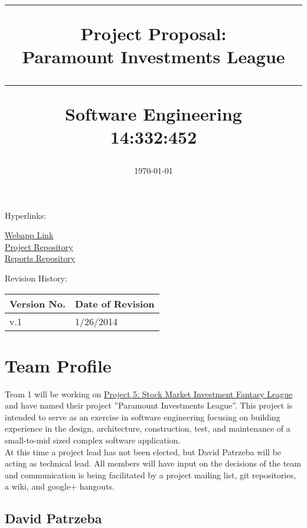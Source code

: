 \documentclass[11pt,letterpaper,oneside]{memoir}
\title{%
{\color{color2} \hrule}\vspace{1cm}
\Huge{\color{color1} Project Proposal:\\Paramount Investments League %
\vspace{1cm}
{\color{color2} \hrule}\vspace{1cm}}
\Large{ \color{color2} Software Engineering\\
14:332:452}
}
\author{\huge{\color{color0}Team 1:\\}\vskip.1in
\Large{\href{mailto:david.patrzeba@gmail.com}{David Patrzeba}\\
\href{mailto:eric.jacob.10@gmail.com}{Eric Jacob}\\
\href{mailto:evanarbeitman@gmail.edu}{Evan Arbeitman}\\
\href{mailto:christopher.a.mancuso@gmail.com}{Christopher Mancuso}\\
\href{mailto:dkarivalis@gmail.edu}{David Karivalis}\\
\href{mailto:jdlziegler@gmail.com}{Jesse Ziegler}}}
\date{\today}
\begin{document}
\titleGM    %

Hyperlinks:\\
\begin{center}
\href{http://192.241.248.91}{Webapp Link}\\
\href{https://github.com/dkarivalis/SEP_SMIFL}{Project Repository}\\
\href{https://github.com/dkarivalis/SEP_SMIFL_reports}{Reports Repository}\\
\end{center}

Revision History:
\begin{longtable}{|p{1.6in}|p{2.6in}|}
\hline
{\large \color{color1}Version No.}&{\large \color{color1}Date of Revision} \\ \hline
v.1&1/26/2014  \\ \hline 
\end{longtable}

\pagebreak  %
\tableofcontents %

\chapter{Team Profile}

Team 1 will be working on \href{http://ece.rutgers.edu/~marsic/books/SE/projects/}
{Project 5: Stock Market Investment Fantasy League} and have named their project
''Paramount Investments League''. This project is intended to serve
as an exercise in software engineering focusing on building experience in the design,
architecture, construction, test, and maintenance of a small-to-mid sized complex
software application.\\

At this time a project lead has not been elected, but David Patrzeba will be acting
as technical lead.  All members will have input on the decisions of the team and
communication is being facilitated by a project mailing list, git repositories,
a wiki, and google+ hangouts.\\

\section{David Patrzeba}
\end{document}
